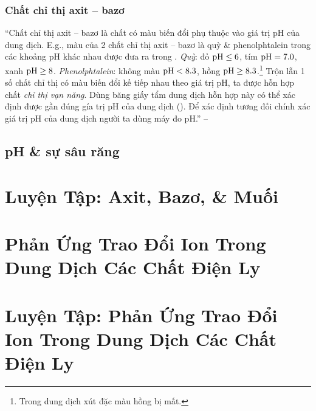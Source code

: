 \documentclass[oneside]{book}
\numberwithin{equation}{section}
\begin{document}
\subsubsection{Chất chỉ thị axit -- bazơ}
``Chất chỉ thị axit -- bazơ là chất có màu biến đổi phụ thuộc vào giá trị pH của dung dịch. E.g., màu của 2 chất chỉ thị axit -- bazơ là quỳ \& phenolphtalein trong các khoảng pH khác nhau được đưa ra trong \cite[Bảng 1.1, p. 19]{SGK_Hoa_Hoc_11_nang_cao}. \textit{Quỳ}: đỏ $\rm pH\le 6$, tím $\rm pH = 7.0$, xanh $\rm pH\ge 8$. \textit{Phenolphtalein}: không màu $\rm pH < 8.3$, hồng $\rm pH\ge 8.3$.\footnote{Trong dung dịch xút đặc màu hồng bị mất.} Trộn lẫn 1 số chất chỉ thị có màu biến đổi kế tiếp nhau theo giá trị pH, ta được hỗn hợp chất \textit{chỉ thị vạn năng}. Dùng băng giấy tẩm dung dịch hỗn hợp này có thể xác định được gần đúng gía trị pH của dung dịch (\cite[Hình 1.5: \textsf{Màu của chất chỉ thị vạn năng (thuốc thử MERCK của Đức) ở các giá trị pH khác nhau}, p. 19]{SGK_Hoa_Hoc_11_nang_cao}). Để xác định tương đối chính xác giá trị pH của dung dịch người ta dùng máy đo pH.'' -- \cite[p. 19]{SGK_Hoa_Hoc_11_nang_cao}

\subsection{pH \& sự sâu răng}


\section{Luyện Tập: Axit, Bazơ, \& Muối}


\section{Phản Ứng Trao Đổi Ion Trong Dung Dịch Các Chất Điện Ly}


\section{Luyện Tập: Phản Ứng Trao Đổi Ion Trong Dung Dịch Các Chất Điện Ly}

\end{document}
